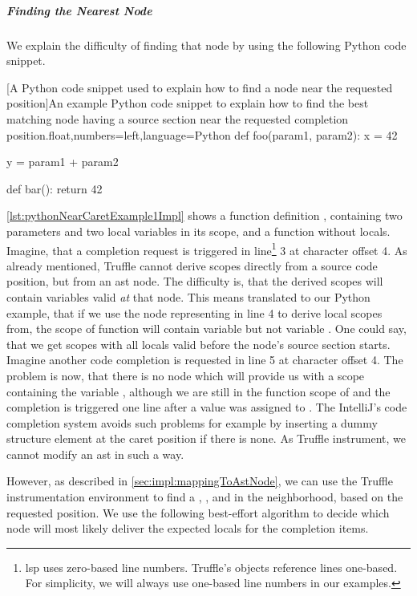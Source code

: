     \subparagraph{Finding the Nearest Node}
    We explain the difficulty of finding that node by using the following Python code snippet.

    \begin{code}{[A Python code snippet used to explain how to find a node near the requested position]An example Python code snippet to explain how to find the best matching node having a source section near the requested completion position.}{float,numbers=left,language=Python}
def foo(param1, param2):
    x = 42
    
    y = param1 + param2


def bar():
    return 42
    \end{code}

    \autoref{lst:pythonNearCaretExample1Impl} shows a function definition , containing two parameters and two local variables in its scope, and a function  without locals. Imagine, that a completion request is triggered in line\footnote{\ac{lsp} uses zero-based line numbers. Truffle's  objects reference lines one-based. For simplicity, we will always use one-based line numbers in our examples.} 3 at character offset 4. As already mentioned, Truffle cannot derive scopes directly from a source code position, but from an \ac{ast} node. The difficulty is, that the derived scopes will contain variables valid \emph{at} that node. This means translated to our Python example, that if we use the node representing  in line 4 to derive local scopes from, the scope of function  will contain variable  but not variable . One could say, that we get scopes with all locals valid before the node's source section starts. Imagine another code completion is requested in line 5 at character offset 4. The problem is now, that there is no node which will provide us with a scope containing the variable , although we are still in the function scope of  and the completion is triggered one line after a value was assigned to . The IntelliJ's code completion system avoids such problems for example by inserting a dummy structure element at the caret position if there is none. As Truffle instrument, we cannot modify an \ac{ast} in such a way.
    
    However, as described in \autoref{sec:impl:mappingToAstNode}, we can use the Truffle instrumentation environment to find a , , and  in the neighborhood, based on the requested position. We use the following best-effort algorithm to decide which node will most likely deliver the expected locals for the completion items.

